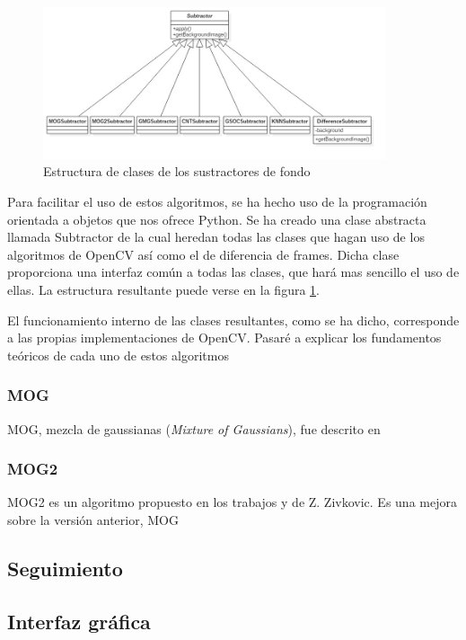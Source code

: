 \begin{figure}
    \centering
    \includegraphics[width=0.9\textwidth]{images/subtractors}
    \caption{Estructura de clases de los sustractores de fondo}
    \label{fig:subtractors}
\end{figure}

Para facilitar el uso de estos algoritmos, se ha hecho uso de la programación orientada a objetos que nos ofrece Python. Se ha creado una clase abstracta llamada Subtractor de la cual heredan todas las clases que hagan uso de los algoritmos de OpenCV así como el de diferencia de frames. Dicha clase proporciona una interfaz común a todas las clases, que hará mas sencillo el uso de ellas. La estructura resultante puede verse en la figura \ref{fig:subtractors}.

El funcionamiento interno de las clases resultantes, como se ha dicho, corresponde a las propias implementaciones de OpenCV. Pasaré a explicar los fundamentos teóricos de cada uno de estos algoritmos

\subsubsection*{MOG}
MOG, mezcla de gaussianas (\textit{Mixture of Gaussians}), fue descrito en  \cite{KaewTraKulPong2002} 

\subsubsection*{MOG2}
MOG2 es un algoritmo propuesto en los trabajos \cite{art:Zivkovic1} y \cite{art:Zivkovic2} de Z. Zivkovic. Es una mejora sobre la versión anterior, MOG

\subsection{Seguimiento}

\subsection{Interfaz gráfica}


